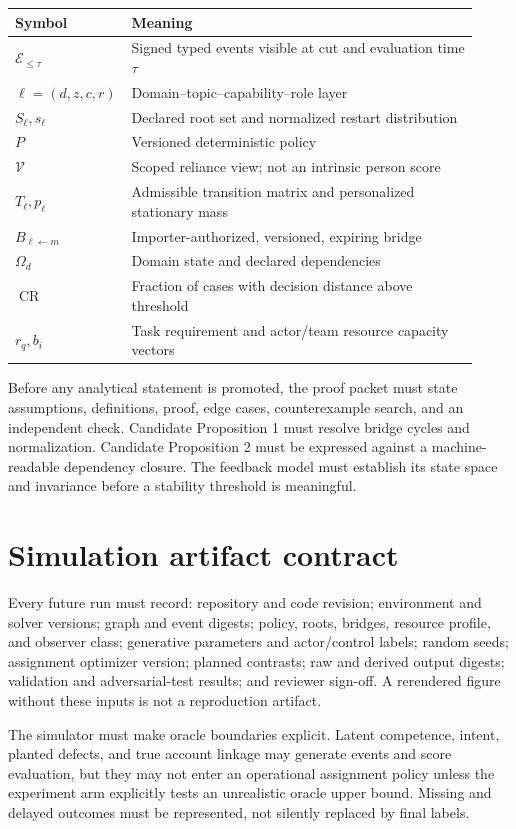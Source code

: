 \documentclass[11pt]{article}
\newcommand{\view}{\mathcal{V}}
\newcommand{\events}{\mathcal{E}}
\newcommand{\CR}{\operatorname{CR}}
\begin{document}
\begin{longtable}{@{}p{0.18\linewidth}p{0.74\linewidth}@{}}
\toprule
Symbol & Meaning \\
\midrule
$\events_{\leq\tau}$ & Signed typed events visible at cut and evaluation time $\tau$ \\
$\ell=(d,z,c,r)$ & Domain--topic--capability--role layer \\
$S_\ell,s_\ell$ & Declared root set and normalized restart distribution \\
$P$ & Versioned deterministic policy \\
$\view$ & Scoped reliance view; not an intrinsic person score \\
$T_\ell,p_\ell$ & Admissible transition matrix and personalized stationary mass \\
$B_{\ell\leftarrow m}$ & Importer-authorized, versioned, expiring bridge \\
$\Omega_d$ & Domain state and declared dependencies \\
$\CR$ & Fraction of cases with decision distance above threshold \\
$r_q,b_i$ & Task requirement and actor/team resource capacity vectors \\
\bottomrule
\end{longtable}

Before any analytical statement is promoted, the proof packet must state assumptions, definitions, proof, edge cases, counterexample search, and an independent check.  Candidate Proposition 1 must resolve bridge cycles and normalization.  Candidate Proposition 2 must be expressed against a machine-readable dependency closure.  The feedback model must establish its state space and invariance before a stability threshold is meaningful.

\section{Simulation artifact contract}

Every future run must record: repository and code revision; environment and solver versions; graph and event digests; policy, roots, bridges, resource profile, and observer class; generative parameters and actor/control labels; random seeds; assignment optimizer version; planned contrasts; raw and derived output digests; validation and adversarial-test results; and reviewer sign-off.  A rerendered figure without these inputs is not a reproduction artifact.

The simulator must make oracle boundaries explicit.  Latent competence, intent, planted defects, and true account linkage may generate events and score evaluation, but they may not enter an operational assignment policy unless the experiment arm explicitly tests an unrealistic oracle upper bound.  Missing and delayed outcomes must be represented, not silently replaced by final labels.



\end{document}
